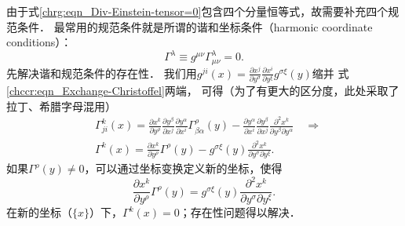 由于式\eqref{chrg:eqn_Div-Einstein-tensor=0}包含四个分量恒等式，故需要补充四个规范条件．
最常用的规范条件就是所谓的谐和坐标条件（harmonic coordinate conditions）：
\begin{equation}\label{chfd:eqn_harmonic-coordinate}
    \Gamma^\lambda \equiv g^{\mu\nu} \Gamma^\lambda_{\mu\nu} =0.
\end{equation}
先解决谐和规范条件的存在性．
我们用$g^{ji}(x)=\frac{\partial x^j}{\partial y^\sigma}
\frac{\partial x^i}{\partial y^\xi}g^{\sigma\xi}(y)$缩并
式\eqref{chccr:eqn_Exchange-Christoffel}两端，
可得（为了有更大的区分度，此处采取了拉丁、希腊字母混用）
\begin{equation}
    \begin{aligned}
        & \Gamma^{k}_{ji}(x) = \frac{\partial x^k}{\partial  y^\rho}
        \frac{\partial y^\beta}{\partial x^j} \frac{\partial y^\alpha}{\partial x^i}
        \Gamma^{\rho}_{\beta\alpha}(y)
        -\frac{\partial y^\alpha }{\partial {x^i}}\frac{\partial {y^\beta }}{\partial {x^j}}
        \frac{{{\partial ^2}{x^k}}}
        {\partial {y^\beta }\partial {y^\alpha }}  \quad \Rightarrow \\
        &  \Gamma^{k}(x) = \frac{\partial x^k}{\partial  y^\rho} \Gamma^{\rho}(y)
        - g^{\sigma\xi}(y)    \frac{{{\partial ^2}{x^k}}}
        {\partial {y^\sigma }\partial {y^\xi }} .
    \end{aligned}
\end{equation}
如果$\Gamma^{\rho}(y) \neq 0$，可以通过坐标变换定义新的坐标，使得
\begin{equation}
    \frac{\partial x^k}{\partial  y^\rho} \Gamma^{\rho}(y)
    = g^{\sigma\xi}(y)    \frac{{{\partial ^2}{x^k}}}
    {\partial {y^\sigma }\partial {y^\xi }} .
\end{equation}
在新的坐标（$\{x\}$）下，$\Gamma^{k}(x)=0$；存在性问题得以解决．

